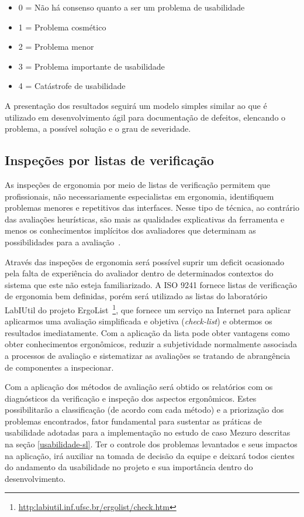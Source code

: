 \begin{itemize}

    \item 0 = Não há consenso quanto a ser um problema de usabilidade

    \item 1 = Problema cosmético

    \item 2 = Problema menor
	
    \item 3 = Problema importante de usabilidade

    \item 4 = Catástrofe de usabilidade

\end{itemize}

A presentação dos resultados seguirá um modelo simples similar ao que é
utilizado em desenvolvimento ágil para documentação de defeitos, elencando o
problema, a possível solução e o grau de severidade.

\subsection{Inspeções por listas de verificação}
As inspeções de ergonomia por meio de listas de verificação permitem que
profissionais, não necessariamente especialistas em ergonomia, identifiquem
problemas menores e repetitivos das interfaces.
%
Nesse tipo de técnica, ao contrário das avaliações heurísticas, são mais as
qualidades explicativas da ferramenta e menos os conhecimentos implícitos dos
avaliadores que determinam as possibilidades para a avaliação~\cite{cybis2010}.

%
Através das inspeções de ergonomia será possível suprir um deficit ocasionado
pela falta de experiência do avaliador dentro de determinados contextos do
sistema que este não esteja familiarizado.
%
A ISO 9241 fornece listas de verificação de ergonomia bem definidas, porém será
utilizado as listas do laboratório LabIUtil do projeto
ErgoList~\footnote{\url{http:labiutil.inf.ufsc.br/ergolist/check.htm}},
que fornece um serviço na Internet para aplicar aplicarmos uma avaliação
simplificada e objetiva (\textit{check-list}) e obtermos os resultados
imediatamente.
%
Com a aplicação da lista pode obter vantagens como obter conhecimentos
ergonômicos, reduzir a subjetividade normalmente associada a processos de
avaliação e sistematizar as avaliações se tratando de abrangência de componentes
a inspecionar.

Com a aplicação dos métodos de avaliação será obtido os relatórios com os diagnósticos da verificação e inspeção dos aspectos ergonômicos. Estes possibilitarão a classificação (de acordo com cada método) e a priorização dos problemas encontrados, fator fundamental para sustentar as práticas de usabilidade adotadas para a implementação no estudo de caso Mezuro descritas na seção \ref{usabilidade-sl}. Ter o controle dos problemas levantados e seus impactos na aplicação, irá auxiliar na tomada de decisão da equipe e deixará todos cientes do andamento da usabilidade no projeto e sua importância dentro do desenvolvimento. 